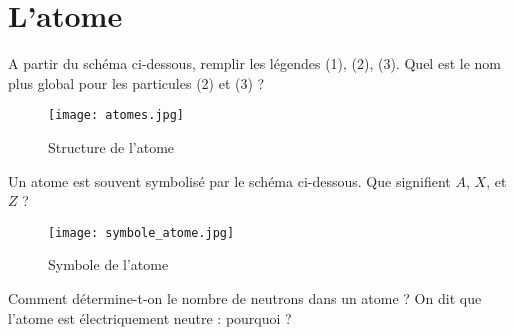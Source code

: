 \documentclass{exam}
\begin{document}
\section*{L'atome}

\begin{questions}
  \question[1] A partir du schéma ci-dessous, remplir les légendes (1), (2), (3). Quel est le nom plus global pour les particules (2) et (3) ?

  \begin{figure}[H]
    \centering
    \texttt{[image: atomes.jpg]}
    \caption{\label{} Structure de l'atome}
  \end{figure}

  \question[1] Un atome est souvent symbolisé par le schéma ci-dessous. Que signifient $A$, $X$, et $Z$ ?

  \begin{figure}[H]
    \centering
    \texttt{[image: symbole\_atome.jpg]}
    \caption{\label{} Symbole de l'atome}
  \end{figure}

  \question[1] Comment détermine-t-on le nombre de neutrons dans un atome ?
  \question[0.5] On dit que l'atome est électriquement neutre : pourquoi ?

\end{questions}
\end{document}
